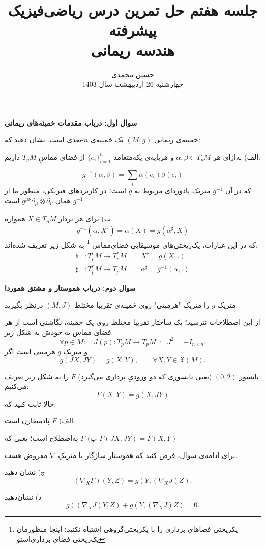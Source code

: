 \documentclass[a4paper, 12pt]{article}
\title{\textbf{
 جلسه هفتم حل تمرین درس ریاضی‌فیزیک پیشرفته
 \\
 \small
 ‌هندسه ریمانی
}}
\author{حسین محمدی
\\
\small
چهارشنبه 26 اردیبهشت سال 1403
}
\date{}
\newenvironment{parind}{%
	\par%
	\medskip
	\leftskip=0mm\rightskip=7mm
	\noindent\ignorespaces}{%
	\par\medskip}
\begin{document}
\maketitle

\textbf{سوال اول:
درباب مقدمات خمینه‌های ریمانی
}

\vspace{0.7em}
خمینه‌ی ریمانی
$(M,g)$ یک خمینه‌ی 
$n$-بعدی است. نشان دهید که: 
\begin{parind}
	الف) به‌ازای هر 
	$\alpha,\beta \in T_p^\star M$
	و هرپایه‌ی یکه‌متعامد
	$\{e_i\}_{i=1}^n$
	از فضای مماسِ
	$T_pM$
	داریم:

	\[
	g^{-1}(\alpha,\beta) = \sum_{i} \alpha(e_i)\beta(e_i)
	\]
که در آن 
$g^{-1}$
متریک پادوردای مربوط به $g$ است؛ در کاربرد‌های فیزیکی، منظور ما از 
$g^{-1}$
همان 
$g^{\mu\nu} \partial_\mu\otimes\partial_\nu$
است.

ب)
برای هر بردار 
$X \in T_pM$
همواره 
\[
g^{-1} ( \alpha , X^{\flat}) = \alpha(X) = g(\alpha^\sharp,X)
\]
که در این عبارات، یک‌ریختی‌های موسیقایی فضای‌مماس
\footnote{یکر‌یختی فضاهای برداری را با یکریختی‌گروهی اشتباه نکنید؛ اینجا منظورمان یک‌ریختی فضای برداری‌استو}
به شکل زیر تعریف شده‌اند:
\begin{equation*}
	\begin{aligned}
		\flat &: T_pM \xrightarrow{\quad} T_p^*M \qquad X^\flat = g(X,.) \\
		\sharp&: T_p^*M \xrightarrow{\quad} T_pM \qquad \alpha^\sharp = g^{-1}(\alpha,.) 
	\end{aligned}
\end{equation*}
\end{parind}

\newpage
\textbf{سوال دوم: درباب هموستار و مشتق هموردا}

\vspace{0.7em}
 متریک
 $g$
 را متریک "هرمیتی" روی خمینه‌ی تقریبا مختلط
 $(M,J)$
  در‌نظر بگیرید.
  
  از این اصطلاحات نترسید؛ یک ساختار تقریبا مختلط
  روی یک خمینه، نگاشتی است از هر فضای مماس به خودش به شکل زیر:
  \[
  \forall p\in M: \quad J(p): T_pM \xrightarrow{\quad} T_pM \;\; : \;\; J^2=-I_{n\times n}.
  \]
  و متریک $g$ هرمیتی است اگر 
  \[
  g(JX,JY) = g(X,Y), \qquad \forall X,Y \in \mathfrak{X}(M).
  \]
  
  تانسور 
  $(0,2)$
  (یعنی تانسوری که دو ورودیِ برداری می‌گیرد) $F$ را به شکل زیر تعریف می‌کنیم:
  \[
  F(X,Y) = g(X,JY)
  \]
  حالا ثابت کنید که:
  \begin{parind}
  	الف) $F$ پادمتقارن است.
  	
  	ب) $F$ به‌اصطلاح 
  	 است؛ یعنی که 
  	 $F(JX,JY) = F(X,Y)$
  	
  	برای ادامه‌ی سوال، فرض کنید که هموستار سازگار با متریکِ
  	$\nabla$
  	مفروض هست.
  	
  	ج) نشان دهید
  	\[
  	(\nabla_X F)(Y,Z) = g(Y,(\nabla_XJ)Z).
  	\]
  	
  	د) نشان‌دهید
  	\[
  	g((\nabla_XJ)Y,Z)+ g(Y,(\nabla_XJ)Z) = 0.
  	\]
  \end{parind}
\end{document}
